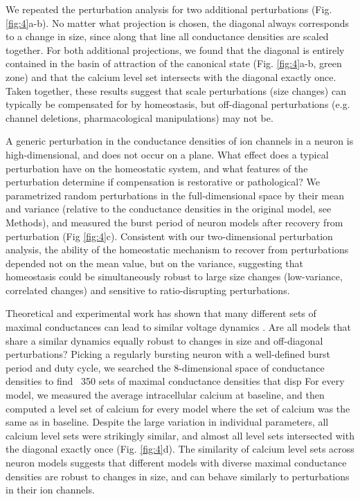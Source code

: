 \documentclass[9pt,lineno]{elife}
\begin{document}
We repeated the perturbation analysis for two additional perturbations (Fig. \ref{fig:4}a-b). No matter what projection is chosen, the diagonal always corresponds to a change in size, since along that line all conductance densities are scaled together. For both additional projections, we found that the diagonal is entirely contained in the basin of attraction of the canonical state (Fig. \ref{fig:4}a-b, green zone) and that the calcium level set intersects with the diagonal exactly once. Taken together, these results suggest that scale perturbations (size changes) can typically be compensated for by homeostasis, but off-diagonal perturbations (e.g. channel deletions, pharmacological manipulations) may not be. 

A generic perturbation in the conductance densities of ion channels in a neuron is high-dimensional, and does not occur on a plane. What effect does a typical perturbation have on the homeostatic system, and what features of the perturbation determine if compensation is restorative or pathological? We parametrized random perturbations in the full-dimensional space by their mean and variance (relative to the conductance densities in the original model, see Methods), and measured the burst period of neuron models after recovery from perturbation (Fig \ref{fig:4}c). Consistent with our two-dimensional perturbation analysis, the ability of the homeostatic mechanism to recover from perturbations depended not on the mean value, but on the variance, suggesting that homeostasis could be simultaneously robust to large size changes (low-variance, correlated changes) and sensitive to ratio-disrupting perturbations. 

Theoretical and experimental work has shown that many different sets of maximal conductances can lead to similar voltage dynamics \citep{Prinz:2003eza,Golowasch:2002cza,Goldman:2001vva,Taylor:2009kb, Marder:2011de,Caplan:2014jd,Swensen:2005bo, Aizenman:2003fc}. Are all models that share a similar dynamics equally robust to changes in size and off-diagonal perturbations? Picking a regularly bursting neuron with a well-defined burst period and duty cycle, we searched the 8-dimensional space of conductance densities to find ~350 sets of maximal conductance densities that disp For every model, we measured the average intracellular calcium at baseline, and then computed a level set of calcium for every model where the set of calcium was the same as in baseline. Despite the large variation in individual parameters, all calcium level sets were strikingly similar, and almost all level sets intersected with the diagonal exactly once (Fig. \ref{fig:4}d). The similarity of calcium level sets across neuron models suggests that different models with diverse maximal conductance densities are  robust to changes in size, and can behave similarly to perturbations in their ion channels. 
\end{document}
